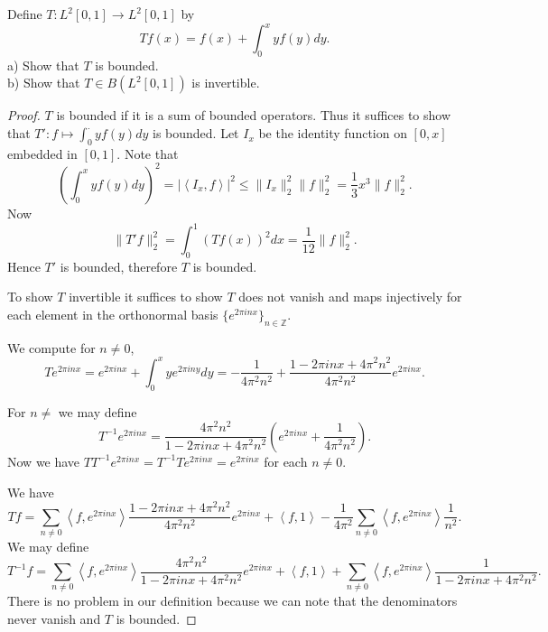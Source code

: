 \begin{problem}
	Define $T: L^2[0,1] \rightarrow L^2[0,1]$ by
\[
T f(x)=f(x)+\int_0^x y f(y) d y .
\]
a) Show that $T$ is bounded.\\
b) Show that $T \in B\left(L^2[0,1]\right)$ is invertible.
\end{problem}
\begin{proof}
	$T$ is bounded if it is a sum of bounded operators. Thus it suffices to show that $T': f \mapsto \int _0^\cdot y f(y) d y$ is bounded. 
	Let $I_x$ be the identity function on $[0,x]$ embedded in $[0,1]$. Note that
	\[
		\left( \int _0^x y f(y) dy  \right) ^2 =
		\left| \left\langle I_x, f \right\rangle  \right| ^2
		\le \|I_x\|_2^2 \|f\|_2^2 = \frac{1}{3} x^3 \|f\|_2^2
	.\] 
	Now
	\[
		\|T' f\|_2^2 = \int _0^1 (T f(x))^2 dx = \frac{1}{12}\|f\|_2^2
	.\] 
	Hence $T'$ is bounded, therefore $T$ is bounded.

	To show $T$ invertible it suffices to show $T$ does not vanish and maps injectively for each element in the orthonormal basis $\{e^{2 \pi in x}\}_{n \in \mathbb{Z}} $.
	
	We compute for $n \neq 0$,
	\[
		T e^{2 \pi i n x} = e^{2 \pi i n x} + \int _0^x y e^{2 \pi i n y} d y = -\frac{1}{4 \pi^2 n^2} + \frac{1 - 2 \pi i n x + 4 \pi^2 n^2}{ 4 \pi^2 n^2} e^{2 \pi i n x}
	.\] 

	For $n \neq $ we may define
	\[
		T^{-1} e^{2 \pi i n x} = \frac{ 4 \pi^2 n^2}{1 - 2 \pi i n x + 4 \pi^2 n^2} \left(e^{2 \pi i n x} + \frac{1}{4 \pi^2 n^2}\right)
	.\] 
	Now we have $T T^{-1} e^{2 \pi i n x} = T^{-1} T e^{2 \pi i n x} = e^{2 \pi i n x}$ for each $n \neq 0$.

	We have
	\[
		Tf =  \sum_{n \neq 0} \left\langle f, e^{2 \pi i n x} \right\rangle \frac{1 - 2 \pi i n x + 4 \pi^2 n^2}{ 4 \pi^2 n^2} e^{2 \pi i n x} + \left\langle f, 1 \right\rangle - \frac{1}{4 \pi ^2} \sum_{n \neq 0} \left\langle f, e^{2 \pi i n x} \right\rangle \frac{1}{n^2}
	.\] 
	We may define
	\[
		T^{-1}f =  \sum_{n \neq 0} \left\langle f, e^{2 \pi i n x} \right\rangle  \frac{ 4 \pi^2 n^2}{1 - 2 \pi i n x + 4 \pi^2 n^2} e^{2 \pi i n x} + \left\langle f, 1 \right\rangle + \sum_{n \neq 0} \left\langle f, e^{2 \pi i n x} \right\rangle \frac{1}{1 - 2 \pi i n x + 4 \pi^2 n^2}
	.\] 
	There is no problem in our definition because we can note that the denominators never vanish and $T$ is bounded.
\end{proof}

